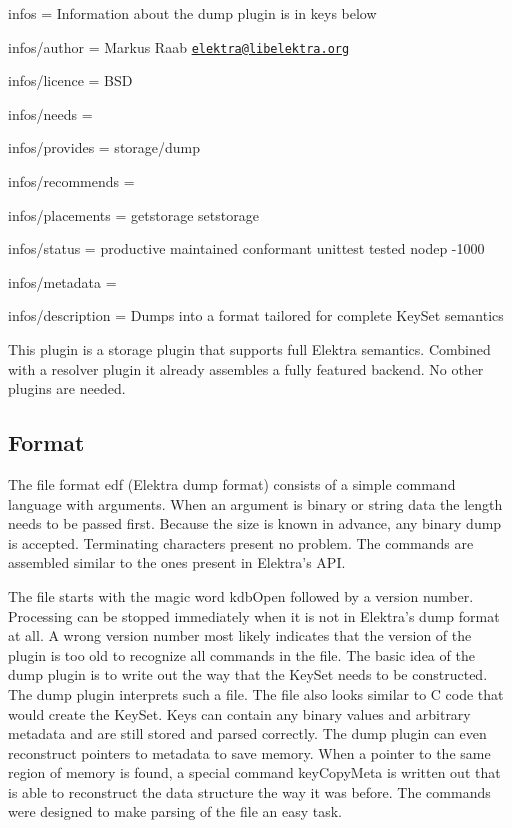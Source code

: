 
\begin{DoxyItemize}
\item infos = Information about the dump plugin is in keys below
\item infos/author = Markus Raab \href{mailto:elektra@libelektra.org}{\tt elektra@libelektra.\+org}
\item infos/licence = B\+SD
\item infos/needs =
\item infos/provides = storage/dump
\item infos/recommends =
\item infos/placements = getstorage setstorage
\item infos/status = productive maintained conformant unittest tested nodep -\/1000
\item infos/metadata =
\item infos/description = Dumps into a format tailored for complete Key\+Set semantics
\end{DoxyItemize}

This plugin is a storage plugin that supports full Elektra semantics. Combined with a resolver plugin it already assembles a fully featured backend. No other plugins are needed.

\subsection*{Format}

The file format edf (Elektra dump format) consists of a simple command language with arguments. When an argument is binary or string data the length needs to be passed first. Because the size is known in advance, any binary dump is accepted. Terminating characters present no problem. The commands are assembled similar to the ones present in Elektra’s A\+PI.

The file starts with the magic word {\ttfamily kdb\+Open} followed by a version number. Processing can be stopped immediately when it is not in Elektra’s dump format at all. A wrong version number most likely indicates that the version of the plugin is too old to recognize all commands in the file. The basic idea of the dump plugin is to write out the way that the Key\+Set needs to be constructed. The dump plugin interprets such a file. The file also looks similar to C code that would create the Key\+Set. Keys can contain any binary values and arbitrary metadata and are still stored and parsed correctly. The dump plugin can even reconstruct pointers to metadata to save memory. When a pointer to the same region of memory is found, a special command {\ttfamily key\+Copy\+Meta} is written out that is able to reconstruct the data structure the way it was before. The commands were designed to make parsing of the file an easy task.

